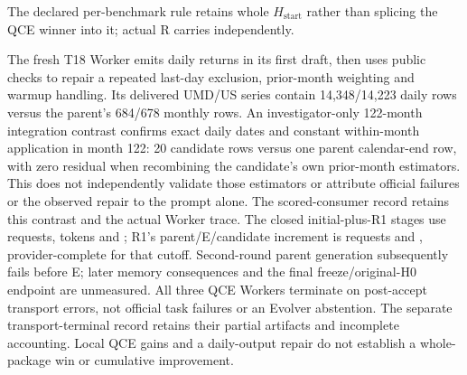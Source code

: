 The declared per-benchmark rule retains whole $H_{\mathrm{start}}$ rather
than splicing the QCE winner into it; actual R carries independently.

The fresh T18 Worker emits daily returns in its first draft, then uses public
checks to repair a repeated last-day exclusion, prior-month weighting and
warmup handling. Its delivered UMD/US series contain 14,348/14,223 daily
rows versus the parent's 684/678 monthly rows. An investigator-only
122-month integration contrast confirms exact daily dates and constant
within-month application in month 122: 20 candidate rows versus one parent
calendar-end row, with zero residual when recombining the candidate's own
prior-month estimators. This does not independently validate those estimators
or attribute official failures or the observed repair to the prompt alone.
The scored-consumer record retains this contrast and the actual Worker trace.
The \ProCumulativeRoneClosedStages{} closed initial-plus-R1 stages use
\ProCumulativeRoneClosedRequests{} requests,
\ProCumulativeRoneClosedTokens{} tokens and \ProCumulativeRoneClosedCost{};
R1's parent/E/candidate increment is \ProCumulativeRoneIncrementRequests{}
requests and \ProCumulativeRoneIncrementCost{}, provider-complete for that
cutoff. Second-round parent generation subsequently fails before E; later
memory consequences and the final freeze/original-H0 endpoint are unmeasured.
All three QCE Workers terminate on post-accept transport errors, not official
task failures or an Evolver abstention. The separate transport-terminal record
retains their partial artifacts and incomplete accounting.
Local QCE gains and a daily-output repair do not establish a whole-package
win or cumulative improvement.

